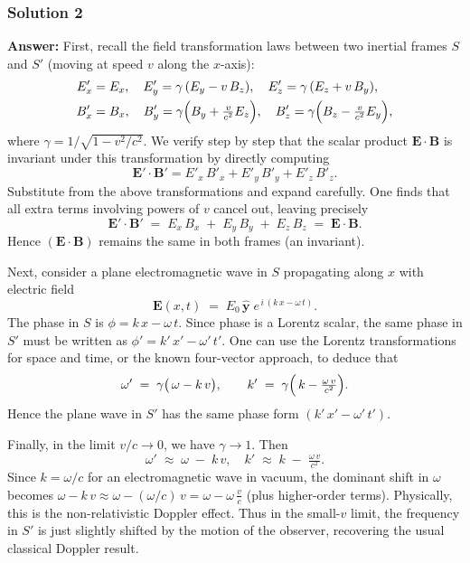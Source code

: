 \documentclass{article}
\begin{document}
\subsubsection{Solution 2}
\noindent
\textbf{Answer:} 
First, recall the field transformation laws between two inertial frames $S$ and $S'$ (moving at speed $v$ along the $x$-axis):
\[
\begin{aligned}
E'_x &= E_x,\quad
E'_y = \gamma \,(E_y - v\,B_z),\quad
E'_z = \gamma \,(E_z + v\,B_y),\\
B'_x &= B_x,\quad
B'_y = \gamma\Bigl(B_y + \tfrac{v}{c^2}E_z\Bigr),\quad
B'_z = \gamma\Bigl(B_z - \tfrac{v}{c^2}E_y\Bigr),
\end{aligned}
\]
where $\gamma = 1/\sqrt{1 - v^2/c^2}$. We verify step by step that the scalar product $\mathbf{E}\cdot \mathbf{B}$ is invariant under this transformation by directly computing 
\[
\mathbf{E}'\cdot \mathbf{B}' 
= E'_x\,B'_x + E'_y\,B'_y + E'_z\,B'_z.
\]
Substitute from the above transformations and expand carefully. One finds that all extra terms involving powers of $v$ cancel out, leaving precisely
\[
\mathbf{E}'\cdot \mathbf{B}' \;=\; E_x\,B_x \;+\; E_y\,B_y \;+\; E_z\,B_z 
\;=\; \mathbf{E}\cdot \mathbf{B}.
\]
Hence $(\mathbf{E}\cdot \mathbf{B})$ remains the same in both frames (an invariant).

Next, consider a plane electromagnetic wave in $S$ propagating along $x$ with electric field 
\[
\mathbf{E}(x,t) \;=\; E_0\,\hat{\mathbf{y}}\; e^{\,i\,(k\,x - \omega\,t)}.
\]
The phase in $S$ is $\phi = k\,x - \omega\,t$. Since phase is a Lorentz scalar, the same phase in $S'$ must be written as $\phi' = k'\,x' - \omega'\,t'$. One can use the Lorentz transformations for space and time, or the known four-vector approach, to deduce that
\[
\omega' \;=\; \gamma\bigl(\,\omega - k\,v\bigr),
\qquad
k' \;=\; \gamma\Bigl(\,k - \tfrac{\omega\,v}{c^2}\Bigr).
\]
Hence the plane wave in $S'$ has the same phase form $(k'\,x' - \omega'\,t')$.

Finally, in the limit $v/c \to 0$, we have $\gamma \to 1$. Then
\[
\omega' \;\approx\; \omega \;-\; k\,v,
\quad
k' \;\approx\; k \;-\; \tfrac{\omega\,v}{c^2}.
\]
Since $k = \omega/c$ for an electromagnetic wave in vacuum, the dominant shift in $\omega$ becomes $\omega - k\,v \approx \omega - (\omega/c)\,v = \omega - \omega\,\tfrac{v}{c}$ (plus higher-order terms). Physically, this is the non-relativistic Doppler effect. Thus in the small-$v$ limit, the frequency in $S'$ is just slightly shifted by the motion of the observer, recovering the usual classical Doppler result.
\end{document}
